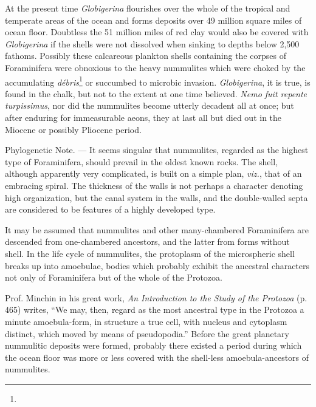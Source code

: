\documentclass[a4paper, 12pt, oneside]{article}
\begin{document}
At the present time \emph{Globigerina} flourishes over the whole of the tropical and temperate areas of the ocean and forms deposits over 49 million square miles of ocean floor. Doubtless the 51 million miles of red clay would also be covered with \emph{Globigerina} if the shells were not dissolved when sinking to depths below 2,500 fathoms. Possibly these calcareous plankton shells containing the corpses of Foraminifera were obnoxious to the heavy nummulites which were choked by the accumulating \emph{débris}\footnote{} or succumbed to microbic invasion. \emph{Globigerina}, it is true, is found in the chalk, but not to the extent at one time believed. \emph{Nemo fuit repente turpissimus}, nor did the nummulites become utterly decadent all at once; but after enduring for immeasurable aeons, they at last all but died out in the Miocene or possibly Pliocene period.

Phylogenetic Note. --- It seems singular that nummulites, regarded as the highest type of Foraminifera, should prevail in the oldest known rocks. The shell, although apparently very complicated, is built on a simple plan, \emph{viz.}, that of an embracing spiral. The thickness of the walls is not perhaps a character denoting high organization, but the canal system in the walls, and the double-walled septa are considered to be features of a highly developed type.

It may be assumed that nummulites and other many-chambered Foraminifera are descended from one-chambered ancestors, and the latter from forms without shell. In the life cycle of nummulites, the protoplasm of the microspheric shell breaks up into amoebulae, bodies which probably exhibit the ancestral characters not only of Foraminifera but of the whole of the Protozoa.

Prof. Minchin in his great work, \emph{An Introduction to the Study of the Protozoa} (p. 465) writes, ``We may, then, regard as the most ancestral type in the Protozoa a minute amoebula-form, in structure a true cell, with nucleus and cytoplasm distinct, which moved by means of pseudopodia.'' Before the great planetary nummulitic deposits were formed, probably there existed a period during which the ocean floor was more or less covered with the shell-less amoebula-ancestors of nummulites.
\end{document}
